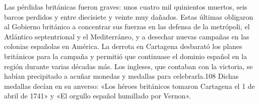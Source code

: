 Las pérdidas británicas fueron graves: unos cuatro mil quinientos
muertos, seis barcos perdidos y entre diecisiete y veinte muy
dañados. Estas últimas obligaron al Gobierno británico a concentrar
sus fuerzas en las defensa de la metrópoli, el Atlántico septentrional
y el Mediterráneo, y a desechar nuevas campañas en las colonias
españolas en América. La derrota en Cartagena desbarató los planes
británicos para la campaña y permitió que continuase el dominio
español en la región durante varias décadas más. Los ingleses, que
contaban con la victoria, se habían precipitado a acuñar monedas y
medallas para celebrarla.108 Dichas medallas decían en su anverso:
«Los héroes británicos tomaron Cartagena el 1 de abril de 1741» y «El
orgullo español humillado por Vernon».
